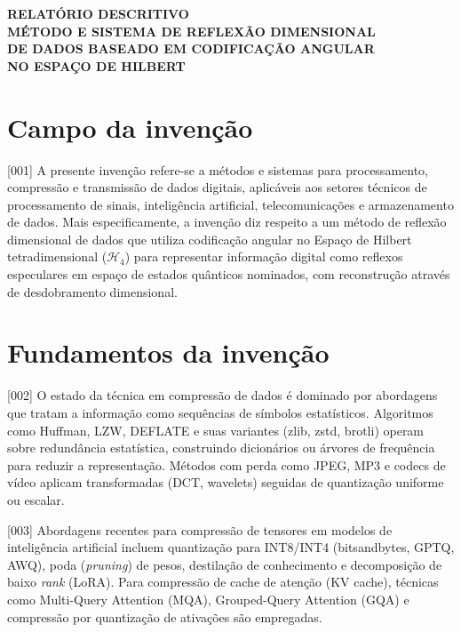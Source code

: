 \documentclass[12pt,a4paper]{article}
\newcommand{\Hfour}{\mathcal{H}_4}
\begin{document}
\begin{center}
{\Large\bfseries RELATÓRIO DESCRITIVO}\\[0.8cm]
{\large\bfseries MÉTODO E SISTEMA DE REFLEXÃO DIMENSIONAL\\
DE DADOS BASEADO EM CODIFICAÇÃO ANGULAR\\
NO ESPAÇO DE HILBERT}\\[0.8cm]
\end{center}

\section{Campo da invenção}

{[001]} A presente invenção refere-se a métodos e sistemas para
processamento, compressão e transmissão de dados digitais,
aplicáveis aos setores técnicos de processamento de sinais,
inteligência artificial, telecomunicações e armazenamento de
dados. Mais especificamente, a invenção diz respeito a um
método de reflexão dimensional de dados que utiliza codificação
angular no Espaço de Hilbert tetradimensional ($\Hfour$) para
representar informação digital como reflexos especulares em
espaço de estados quânticos nominados, com reconstrução através
de desdobramento dimensional.

\section{Fundamentos da invenção}

{[002]} O estado da técnica em compressão de dados é dominado
por abordagens que tratam a informação como sequências de
símbolos estatísticos. Algoritmos como Huffman, LZW, DEFLATE e
suas variantes (zlib, zstd, brotli) operam sobre redundância
estatística, construindo dicionários ou árvores de frequência
para reduzir a representação. Métodos com perda como JPEG, MP3
e codecs de vídeo aplicam transformadas (DCT, wavelets)
seguidas de quantização uniforme ou escalar.

{[003]} Abordagens recentes para compressão de tensores em
modelos de inteligência artificial incluem quantização para
INT8/INT4 (bitsandbytes, GPTQ, AWQ), poda (\textit{pruning})
de pesos, destilação de conhecimento e decomposição de baixo
\textit{rank} (LoRA). Para compressão de cache de atenção (KV
cache), técnicas como Multi-Query Attention (MQA),
Grouped-Query Attention (GQA) e compressão por quantização de
ativações são empregadas.
\end{document}
